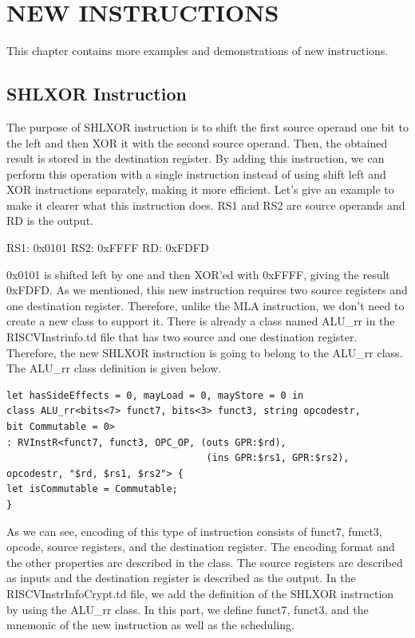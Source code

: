 \clearpage
\chapter{NEW INSTRUCTIONS}\label{Ch9}
This chapter contains more examples and demonstrations of new instructions.

\section{SHLXOR Instruction}\label{sec:shlxor}
The purpose of SHLXOR instruction is to shift the first source operand one bit to the left and then XOR it with the second source operand. Then, the obtained result is stored in the destination register. By adding this instruction, we can perform this operation with a single instruction instead of using shift left and XOR instructions separately, making it more efficient.
Let’s give an example to make it clearer what this instruction does. RS1 and RS2 are source operands and RD is the output.
\par
RS1: 0x0101     RS2: 0xFFFF     RD: 0xFDFD
\par
0x0101 is shifted left by one and then XOR’ed with 0xFFFF, giving the result 0xFDFD.
As we mentioned, this new instruction requires two source registers and one destination register. Therefore, unlike the MLA instruction, we don’t need to create a new class to support it. There is already a class named ALU\_rr in the RISCVInstrinfo.td file that has two source and one destination register. Therefore, the new SHLXOR instruction is going to belong to the ALU\_rr class. The ALU\_rr class definition is given below.

\begin{lstlisting}
let hasSideEffects = 0, mayLoad = 0, mayStore = 0 in
class ALU_rr<bits<7> funct7, bits<3> funct3, string opcodestr,
bit Commutable = 0>
: RVInstR<funct7, funct3, OPC_OP, (outs GPR:$rd),
                                   (ins GPR:$rs1, GPR:$rs2),
opcodestr, "$rd, $rs1, $rs2"> {
let isCommutable = Commutable;
}
\end{lstlisting}

As we can see, encoding of this type of instruction consists of funct7, funct3, opcode, source registers, and the destination register. The encoding format and the other properties are described in the class. The source registers are described as inputs and the destination register is described as the output.
In the RISCVInstrInfoCrypt.td file, we add the definition of the SHLXOR instruction by using the ALU\_rr class. In this part, we define funct7, funct3, and the mnemonic of the new instruction as well as the scheduling.

